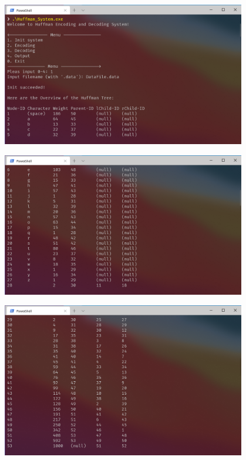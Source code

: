 \documentclass{ctexart}
\begin{document}
    \begin{center}
        \includegraphics[width=0.8\textwidth]{测试1.png}

        \vspace{1em}
        \includegraphics[width=0.8\textwidth]{测试2.png}

        \includegraphics[width=0.8\textwidth]{测试3.png}
    \end{center}
\end{document}
